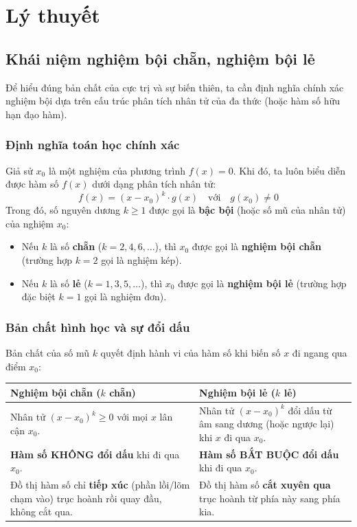 \documentclass[12pt]{article}
\begin{document}
	\section{Lý thuyết}
	
	\subsection{Khái niệm nghiệm bội chẵn, nghiệm bội lẻ}
	
	Để hiểu đúng bản chất của cực trị và sự biến thiên, ta cần định nghĩa chính xác nghiệm bội dựa trên cấu trúc phân tích nhân tử của đa thức (hoặc hàm số hữu hạn đạo hàm).
	
	\subsubsection{Định nghĩa toán học chính xác}
	Giả sử $x_0$ là một nghiệm của phương trình $f(x) = 0$. Khi đó, ta luôn biểu diễn được hàm số $f(x)$ dưới dạng phân tích nhân tử:
	$$f(x) = (x - x_0)^k \cdot g(x) \quad \text{với} \quad g(x_0) \neq 0$$
	Trong đó, số nguyên dương $k \ge 1$ được gọi là \textbf{bậc bội} (hoặc số mũ của nhân tử) của nghiệm $x_0$:
	\begin{itemize}
		\item Nếu $k$ là số \textbf{chẵn} ($k = 2, 4, 6, \dots$), thì $x_0$ được gọi là \textbf{nghiệm bội chẵn} (trường hợp $k=2$ gọi là nghiệm kép).
		\item Nếu $k$ là số \textbf{lẻ} ($k = 1, 3, 5, \dots$), thì $x_0$ được gọi là \textbf{nghiệm bội lẻ} (trường hợp đặc biệt $k=1$ gọi là nghiệm đơn).
	\end{itemize}
	
	\subsubsection{Bản chất hình học và sự đổi dấu}
	Bản chất của số mũ $k$ quyết định hành vi của hàm số khi biến số $x$ đi ngang qua điểm $x_0$:
	
	\begin{center}
		\renewcommand{\arraystretch}{1.5}
		\begin{tabular}{p{7.5cm} p{7.5cm}}
			\toprule
			\textbf{Nghiệm bội chẵn ($k$ chẵn)} & \textbf{Nghiệm bội lẻ ($k$ lẻ)} \\
			\midrule
			Nhân tử $(x-x_0)^k \ge 0$ với mọi $x$ lân cận $x_0$. & Nhân tử $(x-x_0)^k$ đổi dấu từ âm sang dương (hoặc ngược lại) khi $x$ đi qua $x_0$. \\
			\textbf{Hàm số KHÔNG đổi dấu} khi đi qua $x_0$. & \textbf{Hàm số BẮT BUỘC đổi dấu} khi đi qua $x_0$. \\
			Đồ thị hàm số chỉ \textbf{tiếp xúc} (phần lồi/lõm chạm vào) trục hoành rồi quay đầu, không cắt qua. & Đồ thị hàm số \textbf{cắt xuyên qua} trục hoành từ phía này sang phía kia. \\
			\bottomrule
		\end{tabular}
	\end{center}
	
\end{document}
